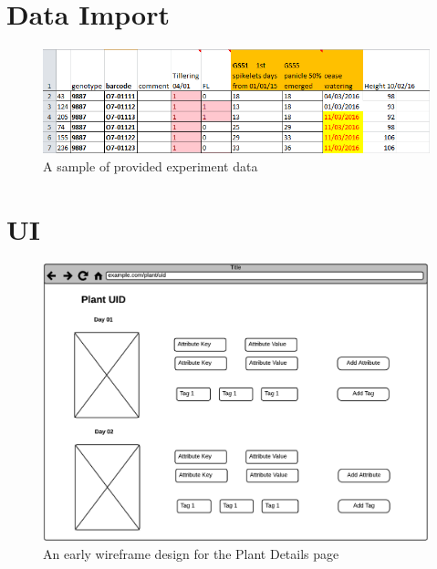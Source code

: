 \section{Data Import}
\begin{figure}[H]
    \centering
    \includegraphics[width=\textwidth]{images/design/data1}
    \caption{A sample of provided experiment data}
    \label{fig:data1}
\end{figure}
\section{UI}
\begin{figure}[H]
    \centering
    \includegraphics[width=\textwidth]{images/design/ui1}
    \caption{An early wireframe design for the Plant Details page}
    \label{fig:ui1}
\end{figure}

